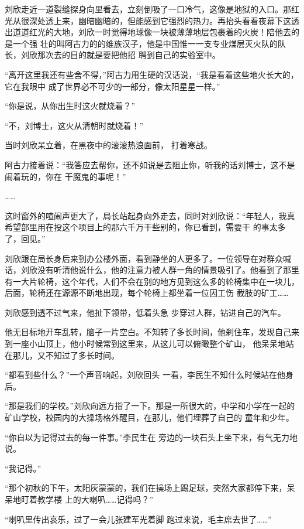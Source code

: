 \documentclass{article}
\begin{document}
刘欣走近一道裂缝探身向里看去，立刻倒吸了一口冷气，这像是地狱的入口。那红光从很深处透上来，幽暗幽暗的，但能感到它强烈的热力。再抬头看看夜幕下这透出道道红光的大地，刘欣一时觉得地球像一块被薄薄地层包裹着的火炭！陪他去的是一个强
\newpage
壮的叫阿古力的的维族汉子，他是中国惟一一支专业煤层灭火队的队长，刘欣那次去的目的就是要把他招
聘到自己的实验室中。 

“离开这里我还有些舍不得，”阿古力用生硬的汉话说，“我是看着这些地火长大的，它在我眼中
成了世界必不可少的一部分，像太阳星星一样。” 


“你是说，从你出生时这火就烧着？” 


“不，刘博士，这火从清朝时就烧着！” 

当时刘欣呆立着，在黑夜中的滚滚热浪面前，
打着寒战。 

阿古力接着说：“我答应去帮你，还不如说是去阻止你，听我的话刘博士，这不是闹着玩的，你在
干魔鬼的事呢！” 


…… 

\newpage

这时窗外的喧闹声更大了，局长站起身向外走去，同时对刘欣说：“年轻人，我真希望部里用在投这个项目上的那六千万干些别的，你已看到，需要干
的事太多了，回见。” 

刘欣跟在局长身后来到办公楼外面，看到静坐的人更多了。一位领导在对群众喊话，刘欣没有听清他说什么，他的注意力被人群一角的情景吸引了。他看到了那里有一大片轮椅，这个年代，人们不会在别的地方见到这么多的轮椅集中在一块儿，后面，轮椅还在源源不断地出现，每个轮椅上都坐着一位因工伤
截肢的矿工…… 

刘欣感到透不过气来，他扯下领带，低着头急
步穿过人群，钻进自己的汽车。 

他无目标地开车乱转，脑子一片空白。不知转了多长时间，他刹住车，发现自己来到一座小山顶上，他小时候常到这里来，从这儿可以俯瞰整个矿山，
他呆呆地站在那儿，又不知过了多长时间。 

\newpage

“都看到些什么？”一个声音响起，刘欣回头
一看，李民生不知什么时候站在他身后。 

“那是我们的学校。”刘欣向远方指了一下。那是一所很大的，中学和小学在一起的矿山学校，校园内的大操场格外醒目，在那儿，他们埋葬了自己的
童年和少年。 

“你自以为记得过去的每一件事。”李民生在
旁边的一块石头上坐下来，有气无力地说。 


“我记得。” 

“那个初秋的下午，太阳灰蒙蒙的，我们在操场上踢足球，突然大家都停下来，呆呆地盯着教学楼
上的大喇叭……记得吗？” 

“喇叭里传出哀乐，过了一会儿张建军光着脚
跑过来说，毛主席去世了……” 
\end{document}
